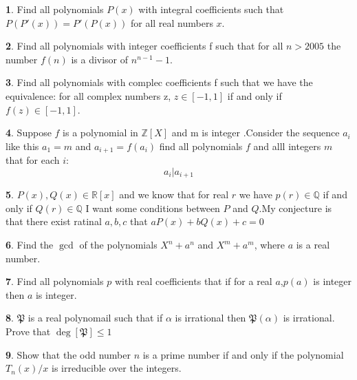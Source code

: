 \documentclass{article}
\theoremstyle{definition}
\newtheorem{p}{}
\begin{document}
\begin{p}
Find all polynomials $P(x)$ with integral coefficients such that $P(P'(x))=P'(P(x))$ for all real numbers $x$.
\end{p}


\begin{p}
Find all polynomials with integer coefficients f such that for all $n>2005$ the number $ f(n)$ is a divisor of $ n^{n-1}-1$.
\end{p}


\begin{p}
Find all polynomials with complec coefficients f such that we have the equivalence: for all complex numbers z, $ z\in[-1,1]$ if and only if $ f(z)\in [-1,1]$.
\end{p}


\begin{p}
Suppose $f$ is a polynomial in $\mathbb{Z}[X]$ and m is integer .Consider the sequence $a_i$ like this $a_1=m$ and $a_{i+1}=f(a_i)$ find all polynomials $f$ and alll integers $m$ that for each $i$:
\[ a_i | a_{i+1}\]
\end{p}


\begin{p}
$P(x),Q(x) \in \mathbb{R}[x]$ and we know that for real $r$ we have $p(r) \in \mathbb{Q}$ if and only if $Q(r) \in \mathbb{Q}$
I want some conditions between $P$ and $Q$.My conjecture is that there exist ratinal $a,b,c$ that $aP(x)+bQ(x)+c=0$
\end{p}


\begin{p}
Find the $\gcd$ of the polynomials $X^n+a^n$ and $X^m+a^m$, where $a$ is a real number.
\end{p}


\begin{p}
Find all polynomials $p$ with real coefficients that if for a real $a$,$p(a)$ is integer then $a$ is integer.
\end{p}



\begin{p}
$\mathfrak {P}$ is a real polynomail such that if $\alpha$ is irrational then $\mathfrak {P} (\alpha)$ is irrational. Prove that $\deg [\mathfrak{P}]\leq 1$
\end{p}



\begin{p}
Show that the odd number $n$ is a prime number if and only if the polynomial $ T_n(x)/x$ is irreducible over the integers.
\end{p}
\end{document}
